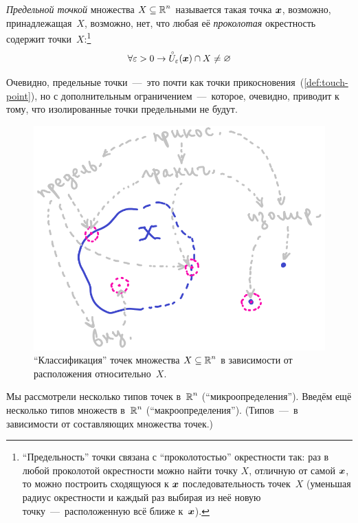 \documentclass[a4paper,12pt]{article}
\renewcommand{\mathring}[1]{\accentset{\circ}{#1}}
\begin{document}
  \begin{definition}
    \emph{Предельной точкой} множества $X \subseteq \operatorname{\mathbb R}^n$ называется такая точка $\boldsymbol x$, возможно, принадлежащая~$X$, возможно, нет, что любая её \emph{проколотая} окрестность содержит точки~$X$:\footnote{
      ``Предельность'' точки связана с ``проколотостью'' окрестности так: раз в любой проколотой окрестности можно найти точку $X$, отличную от самой $\boldsymbol x$, то можно построить сходящуюся к $\boldsymbol x$ последовательность точек~$X$ (уменьшая радиус окрестности и каждый раз выбирая из неё новую точку~---~расположенную всё ближе к~$\boldsymbol x$).
    }
    \[
      \forall \eps > 0 \to \mathring U_{\eps}(\bds x) \cap X \not= \noth
    \]
  \end{definition}

  Очевидно, предельные точки~---~это почти как точки прикосновения~(\ref{def:touch-point}), но с дополнительным ограничением~---~которое, очевидно, приводит к тому, что изолированные точки предельными не будут.

  \begin{figure}[ht]
    \centering
  
    \includegraphics[width=0.8\columnwidth]{vector-types-by-neighbourhood}
  
    \caption{
      ``Классификация'' точек множества $X \hm\subseteq \RR^n$ в зависимости от расположения относительно~$X$.
    }
    \label{fig:vector-types-by-neighbourhood}
  \end{figure}

  \medskip

  Мы рассмотрели несколько типов точек в~$\operatorname{\mathbb R}^n$ (``микроопределения'').
  Введём ещё несколько типов множеств в~$\operatorname{\mathbb R}^n$ (``макроопределения'').
  (Типов~---~в зависимости от составляющих множества точек.)
\end{document}

